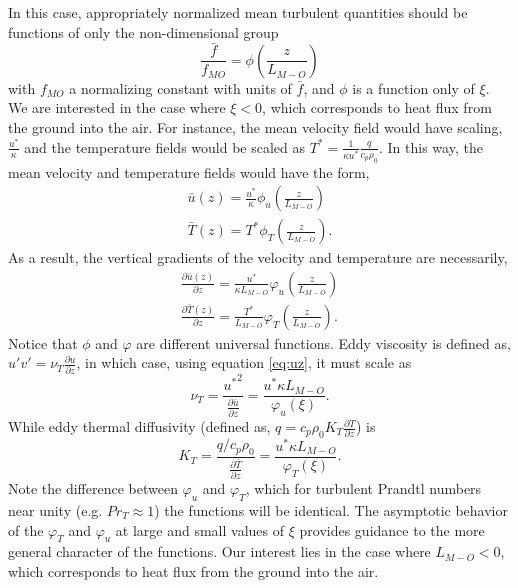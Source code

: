 In this case, appropriately normalized mean turbulent quantities should
be functions of only the non-dimensional group 
\begin{equation}
 \frac{\bar f}{f_{MO}} = \phi(\frac{z}{L_{M-O}})
\end{equation}
with $f_{MO}$ a normalizing constant with units of $\bar f$, and $\phi$
is a function only of $\xi$. We are interested in the case where
$\xi<0$, which corresponds to heat flux from the ground into the
air. For instance, the mean velocity field would have scaling,
$\frac{u^*}{\kappa}$ and the temperature fields would be scaled as $T^*
= \frac{1}{\kappa u^*} \frac{q}{c_p \rho_0}$. In this way, the mean
velocity and temperature fields would have the form,  
\begin{eqnarray}
\bar u(z) = \frac{u^*}{\kappa} \phi_u(\frac{z}{L_{M-O}}) \\
\bar T(z) = T^* \phi_T(\frac{z}{L_{M-O}}).
\end{eqnarray}
As a result, the vertical gradients of the velocity and temperature are
necessarily, 
\begin{eqnarray}
\frac{\partial \bar u(z)}{\partial z} = \frac{u^*}{\kappa L_{M-O}}
 \varphi_u(\frac{z}{L_{M-O}}) \label{eq:uz} \\ 
\frac{\partial \bar T(z)}{\partial z} = \frac{T^*}{L_{M-O}}
 \varphi_T(\frac{z}{L_{M-O}}) \label{eq:tz}.
\end{eqnarray}
Notice that $\phi$ and $\varphi$ are different universal functions. Eddy
viscosity is defined as, $u'v' = \nu_T \frac{\partial
u}{\partial z}$\cite{durbin2001statistical}, in which case, using
equation \ref{eq:uz}, it must scale as
\begin{equation}
 \nu_T = \frac{{u^*}^2}{\frac{\partial \bar u}{\partial z}} = \frac{u^*
  \kappa L_{M-O}}{\varphi_u(\xi)}.
\end{equation}
While eddy thermal diffusivity (defined as, $q = c_p \rho_0 K_T
\frac{\partial T}{\partial z}$) is 
\begin{equation}
 K_T = \frac{q/c_p \rho_0}{\frac{\partial \bar T}{\partial z}} = \frac{u^*
  \kappa L_{M-O}}{\varphi_T(\xi)}.
\label{eqn:eddy_kt}
\end{equation}
Note the difference between $\varphi_u$ and
$\varphi_T$, which for turbulent Prandtl numbers near unity (e.g. $Pr_T
\approx 1$) the functions will be identical. The asymptotic behavior of
the $\varphi_T$ and $\varphi_u$ at large and small values of $\xi$
provides guidance to the more general character of the functions. 
Our interest lies in the case where $L_{M-O}<0$, which corresponds to heat flux
from the ground into the air.  
%


